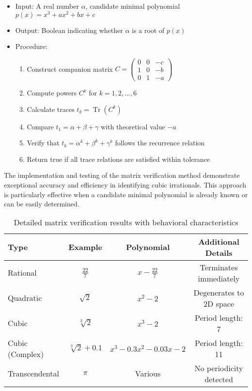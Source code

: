 \begin{algorithm_def}
\begin{itemize}
\item Input: A real number $\alpha$, candidate minimal polynomial $p(x) = x^3 + ax^2 + bx + c$
\item Output: Boolean indicating whether $\alpha$ is a root of $p(x)$
\item Procedure:
\begin{enumerate}
\item Construct companion matrix $C = \begin{pmatrix} 0 & 0 & -c \\ 1 & 0 & -b \\ 0 & 1 & -a \end{pmatrix}$
\item Compute powers $C^k$ for $k = 1, 2, \ldots, 6$
\item Calculate traces $t_k = \operatorname{Tr}(C^k)$
\item Compare $t_1 = \alpha + \beta + \gamma$ with theoretical value $-a$
\item Verify that $t_k = \alpha^k + \beta^k + \gamma^k$ follows the recurrence relation
\item Return true if all trace relations are satisfied within tolerance
\end{enumerate}
\end{itemize}
\end{algorithm_def}

The implementation and testing of the matrix verification method demonstrate exceptional accuracy and efficiency in identifying cubic irrationals. This approach is particularly effective when a candidate minimal polynomial is already known or can be easily determined.

\begin{table}[htbp]
\centering
\small
\begin{tabular}{|l|c|c|c|}
\hline
\textbf{Type} & \textbf{Example} & \textbf{Polynomial} & \textbf{Additional Details} \\
\hline
Rational & $\frac{22}{7}$ & $x - \frac{22}{7}$ & Terminates immediately \\
\hline
Quadratic & $\sqrt{2}$ & $x^2 - 2$ & Degenerates to 2D space \\
\hline
Cubic & $\sqrt[3]{2}$ & $x^3 - 2$ & Period length: 7 \\
\hline
Cubic (Complex) & $\sqrt[3]{2} + 0.1$ & $x^3 - 0.3x^2 - 0.03x - 2$ & Period length: 11 \\
\hline
Transcendental & $\pi$ & Various & No periodicity detected \\
\hline
\end{tabular}
\caption{Detailed matrix verification results with behavioral characteristics}
\label{tab:numerical_verification_details}
\end{table}

